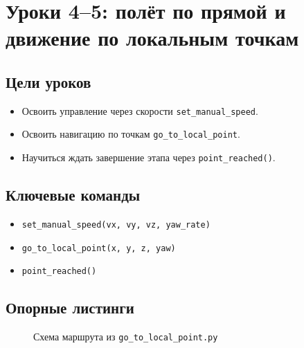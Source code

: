 \section{Уроки 4--5: полёт по прямой и движение по локальным точкам}

\subsection{Цели уроков}
\begin{itemize}
\item Освоить управление через скорости \texttt{set\_manual\_speed}.
\item Освоить навигацию по точкам \texttt{go\_to\_local\_point}.
\item Научиться ждать завершение этапа через \texttt{point\_reached()}.
\end{itemize}

\subsection{Ключевые команды}
\begin{itemize}
\item \texttt{set\_manual\_speed(vx, vy, vz, yaw\_rate)}
\item \texttt{go\_to\_local\_point(x, y, z, yaw)}
\item \texttt{point\_reached()}
\end{itemize}

\subsection{Опорные листинги}



\begin{figure}[H]
\centering
{}
\caption{Схема маршрута из \texttt{go\_to\_local\_point.py}}
\end{figure}

